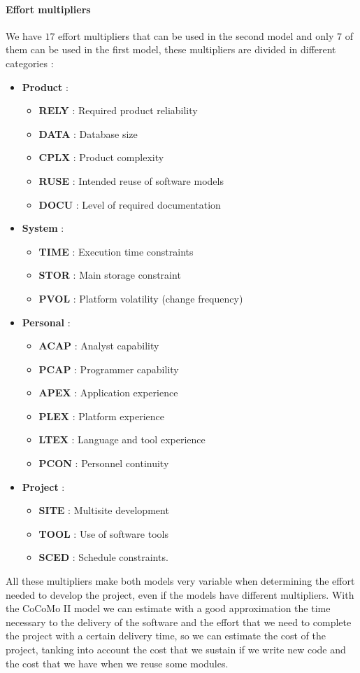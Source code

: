 \documentclass[11pt]{article}
\begin{document}
\paragraph{Effort multipliers} We have $17$ effort multipliers that can be used in the second model and only $7$ of them can be used in the first model, these multipliers are divided in different categories :
\begin{itemize}
\item \textbf{Product} :
\begin{itemize}
\item \textbf{RELY} : Required product reliability
\item \textbf{DATA} : Database size
\item \textbf{CPLX} : Product complexity
\item \textbf{RUSE} : Intended reuse of software models
\item \textbf{DOCU} : Level of required documentation
\end{itemize}
\item \textbf{System} :
\begin{itemize}
\item \textbf{TIME} : Execution time constraints
\item \textbf{STOR} : Main storage constraint
\item \textbf{PVOL} : Platform volatility (change frequency)
\end{itemize}
\item \textbf{Personal} :
\begin{itemize}
\item \textbf{ACAP} : Analyst capability
\item \textbf{PCAP} : Programmer capability
\item \textbf{APEX} : Application experience
\item \textbf{PLEX} : Platform experience
\item \textbf{LTEX} : Language and tool experience
\item \textbf{PCON} : Personnel continuity
\end{itemize}
\item \textbf{Project} :
\begin{itemize}
\item \textbf{SITE} : Multisite development
\item \textbf{TOOL} : Use of software tools
\item \textbf{SCED} : Schedule constraints.
\end{itemize}
\end{itemize}
All these multipliers make both models very variable when determining the effort needed to develop the project, even if the models have different multipliers. With the CoCoMo II model we can estimate with a good approximation the time necessary to the delivery of the software and the effort that we need to complete the project with a certain delivery time, so we can estimate the cost of the project, tanking into account the cost that we sustain if we write new code and the cost that we have when we reuse some modules.
\end{document}
